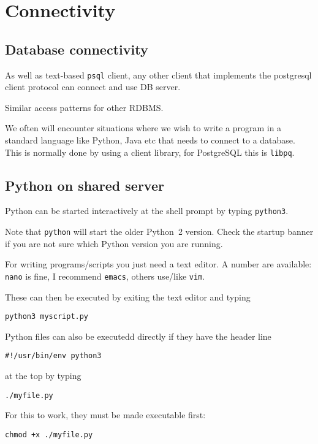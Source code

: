 \chapter{Connectivity}
\label{ch:connectivity}

\section{Database connectivity}
\label{sec:database-connectivity}

As well as text-based \texttt{psql} client, any other client that
implements the postgresql client protocol can connect and use DB server.

Similar access patterns for other RDBMS.

We often will encounter situations where we wish to write a program in a standard language like Python, Java etc that needs to connect to a database.
This is normally done by using a client library, for PostgreSQL this is \texttt{libpq}.

\section{Python on shared server}
\label{sec:python-on-shared-server}

Python can be started interactively at the shell prompt by typing
\texttt{python3}.

Note that \texttt{python} will start the older Python~2 version.
Check the startup banner if you are not sure which Python version you are running.

For writing programs/scripts you just need a text editor.
A number are available: \texttt{nano} is fine, I recommend \texttt{emacs}, others use/like \texttt{vim}.

These can then be executed by exiting the text editor and typing
\begin{verbatim}
python3 myscript.py
\end{verbatim}

Python files can also be executedd directly if they have the header line
\begin{verbatim}
#!/usr/bin/env python3
\end{verbatim}
at the top by typing
\begin{verbatim}
./myfile.py
\end{verbatim}
For this to work, they must be made executable first:
\begin{verbatim}
chmod +x ./myfile.py
\end{verbatim}

